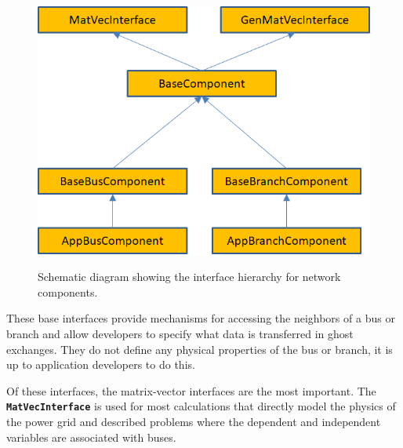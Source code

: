 \documentclass[12pt]{report} %
\begin{document}
\begin{figure}
  \centering
  \includegraphics*[width=6in, height=3.58in, keepaspectratio=true]{Fig5-heirarchy}
  \caption{Schematic diagram showing the interface hierarchy for network components.}
  \label{fig:fig-5}
\end{figure}



These base interfaces provide mechanisms for accessing the neighbors of a bus or branch and allow developers to specify what data is transferred in ghost exchanges. They do not define any physical properties of the bus or branch, it is up to application developers to do this.

Of these interfaces, the matrix-vector interfaces are the most important. The \texttt{\textbf{MatVecInterface}} is used for most calculations that directly model the physics of the power grid and described problems where the dependent and independent variables are associated with buses. 
\end{document}
